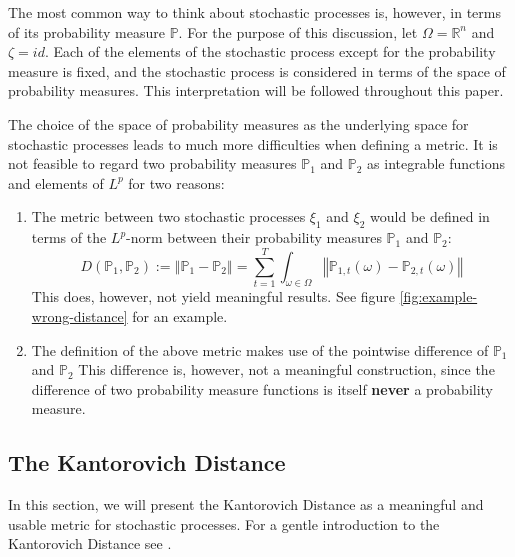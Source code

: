 The most common way to think about stochastic processes is, however, in terms of its probability measure $\mathbb{P}$.
For the purpose of this discussion, let $\Omega=\mathbb{R}^n$ and $\zeta=id$.
Each of the elements of the stochastic process except for the probability measure is fixed, and the stochastic process is considered in terms of the space of probability measures.
This interpretation will be followed throughout this paper.

The choice of the space of probability measures as the underlying space for stochastic processes leads to much more difficulties when defining a metric. It is not feasible to regard two probability measures $\mathbb{P}_1$ and $\mathbb{P}_2$ as integrable functions and elements of $L^p$ for two reasons:
\begin{enumerate}
\item The metric between two stochastic processes $\xi_1$ and $\xi_2$ would be defined in terms of the $L^p$-norm between their probability measures $\mathbb{P}_1$ and $\mathbb{P}_2$:
  \begin{equation}
    \label{eq:prob-measure-metric-as-Lpnorm}
    D(\mathbb{P}_1,\mathbb{P}_2) := \left\Vert \mathbb{P}_1-\mathbb{P}_2\right\Vert = \sum_{t=1}^T\int_{\omega\in\Omega}\left\Vert \mathbb{P}_{1,t}(\omega)-\mathbb{P}_{2,t}(\omega)\right\Vert
  \end{equation}
  This does, however, not yield meaningful results. See figure \ref{fig:example-wrong-distance} for an example.
\item The definition of the above metric makes use of the pointwise difference of $\mathbb{P}_1$ and $\mathbb{P}_2$
  This difference is, however, not a meaningful construction, since the difference of two probability measure functions is itself \textbf{never} a probability measure.
\end{enumerate}

\subsection{The Kantorovich Distance}
\label{sec:kantoro}
In this section, we will present the Kantorovich Distance as a meaningful and usable metric for stochastic processes. For a gentle introduction to the Kantorovich Distance see \cite{Deng2009}.

